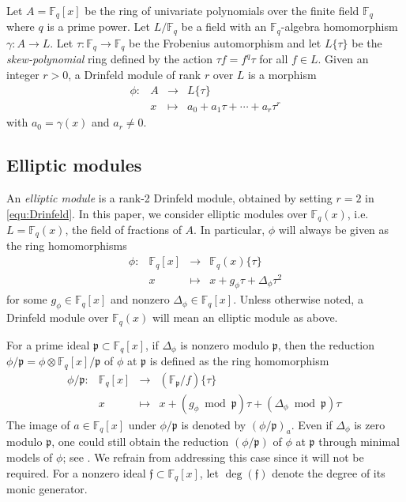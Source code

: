 \documentclass[12pt]{article}
\theoremstyle{plain}
\theoremstyle{definition}
\newcommand{\ang}[1]{\{#1\}}
\def\F{\ensuremath{\mathbb{F}}}
\newcommand{\p}{\mathfrak p}
\newcommand{\f}{\mathfrak f}
\begin{document}
Let $A = \F_q[x]$ be the ring of univariate polynomials over the finite field $\F_q$ where $q$ is a 
prime power. Let $L/\F_q$ be a field with an $\F_q$-algebra homomorphism $\gamma: A \rightarrow 
L$. Let $\tau: \F_q \rightarrow \F_q$ be the Frobenius automorphism and let $L\{\tau\}$ be the 
\textit{skew-polynomial} ring defined by the action $\tau f = f^q\tau$ for all $f \in L$. Given an 
integer $r > 0$, a Drinfeld module of rank $r$ over $L$ is a morphism
\begin{equation}
\label{equ:Drinfeld}
	\begin{array}{rrll}
		\phi : & A & \longrightarrow & L\{\tau\} \\
		& x & \longmapsto & a_0 + a_1\tau + \cdots + a_r\tau^r	
	\end{array}
\end{equation}
with $a_0 = \gamma(x)$ and $a_r \ne 0$. 




\subsection{Elliptic modules}
\label{drinfeld_section}

An \textit{elliptic module} is a rank-2 Drinfeld module, obtained by setting $r = 2$ in 
\eqref{equ:Drinfeld}. In this paper, we consider elliptic modules over $\F_q(x)$, i.e. $L = 
\F_q(x)$, the field of fractions of $A$. In particular, $\phi$ will always be given as the ring 
homomorphisms
\[
\begin{array}{rrll}
	\phi : & \F_q[x] & \longrightarrow & \F_q(x)\ang{\tau} \\
	& x & \longmapsto & x + g_\phi \tau + \Delta_\phi \tau^2	
\end{array}
\]
for some $g_\phi \in \F_q[x]$ and nonzero $\Delta_\phi \in \F_q[x]$. Unless otherwise noted, a 
Drinfeld module over $\F_q(x)$ will mean an elliptic module as above. 

For a prime ideal $\p \subset \F_q[x]$, if $\Delta_\phi$ is nonzero modulo $\p$, then the reduction 
$\phi / \p = \phi \otimes \F_q[x] / \p$ of $\phi$ at $\p$ is defined as the ring homomorphism
\[
\begin{array}{rrll}
	\phi / \p : & \F_q[x] & \longrightarrow & (\F_\p/f) \ang{\tau} \\
	& x & \longmapsto & x + (g_\phi \bmod \p) \tau + (\Delta_\phi \bmod \p) \tau^.
\end{array}
\]
The image of $a \in \F_q[x]$ under $\phi/\p$ is denoted by $(\phi/\p)_a$. Even if $\Delta_{\phi}$ 
is zero modulo $\p$, one could still obtain the reduction $(\phi/\p)$ of $\phi$ at $\p$ through
minimal models of $\phi$; see \cite{gek1}. We refrain from addressing this case since it will not 
be required. For a nonzero ideal $\f \subset \F_q[x]$, let $\deg(\f)$ denote the degree of its 
monic generator.
\end{document}
